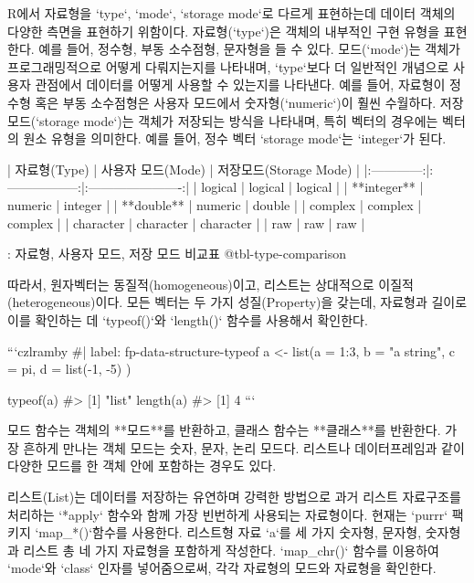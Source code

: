 \documentclass[
  letterpaper,
]{book}
\begin{document}
{R에서 자료형을 `type`, `mode`, `storage mode`로 다르게 표현하는데 데이터 객체의 다양한 측면을 표현하기 위함이다.
자료형(`type`)은 객체의 내부적인 구현 유형을 표현한다.
예를 들어, 정수형, 부동 소수점형, 문자형을 들 수 있다.
모드(`mode`)는 객체가 프로그래밍적으로 어떻게 다뤄지는지를 나타내며, `type`보다 더 일반적인 개념으로 사용자 관점에서 데이터를 어떻게 사용할 수 있는지를 나타낸다.
예를 들어, 자료형이 정수형 혹은 부동 소수점형은 사용자 모드에서 숫자형(`numeric`)이 훨씬 수월하다.
저장 모드(`storage mode`)는 객체가 저장되는 방식을 나타내며, 특히 벡터의 경우에는 벡터의 원소 유형을 의미한다.
예를 들어, 정수 벡터 `storage mode`는 `integer`가 된다.
  

| 자료형(Type) | 사용자 모드(Mode) | 저장모드(Storage Mode) |
|:------------:|:-----------------:|:----------------------:|
|   logical    |      logical      |        logical         |
| **integer**  |      numeric      |        integer         |
|  **double**  |      numeric      |         double         |
|   complex    |      complex      |        complex         |
|  character   |     character     |       character        |
|     raw      |        raw        |          raw           |

: 자료형, 사용자 모드, 저장 모드 비교표 {@tbl-type-comparison}

따라서, 원자벡터는 동질적(homogeneous)이고, 리스트는 상대적으로 이질적(heterogeneous)이다.
모든 벡터는 두 가지 성질(Property)을 갖는데, 자료형과 길이로 이를 확인하는 데 `typeof()`와 `length()` 함수를 사용해서 확인한다.

```czlramby
#| label: fp-data-structure-typeof
a <- list(a = 1:3,
            b = "a string",
            c = pi,
            d = list(-1, -5) )
  
typeof(a)
#> [1] "list"
length(a)
#> [1] 4
```

모드 함수는 객체의 **모드**를 반환하고, 클래스 함수는 **클래스**를 반환한다.
가장 흔하게 만나는 객체 모드는 숫자, 문자, 논리 모드다.
리스트나 데이터프레임과 같이 다양한 모드를 한 객체 안에 포함하는 경우도 있다.

리스트(List)는 데이터를 저장하는 유연하며 강력한 방법으로 과거 리스트 자료구조를 처리하는 `*apply` 함수와 함께 가장 빈번하게 사용되는 자료형이다.
현재는 `purrr` 팩키지 `map_*()`함수를 사용한다.
리스트형 자료 `a`를 세 가지 숫자형, 문자형, 숫자형과 리스트 총 네 가지 자료형을 포함하게 작성한다.
`map_chr()` 함수를 이용하여 `mode`와 `class` 인자를 넣어줌으로써, 각각 자료형의 모드와 자료형을 확인한다.
 

}
\end{document}
